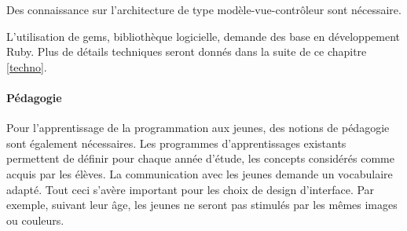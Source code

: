 Des connaissance sur l'architecture de type modèle-vue-contrôleur sont nécessaire. 

L'utilisation de gems, bibliothèque logicielle, demande des base en développement Ruby. Plus de détails techniques seront donnés dans la suite de ce chapitre \ref{techno}. %

\paragraph{Pédagogie}
Pour l'apprentissage de la programmation aux jeunes, des notions de pédagogie sont également nécessaires. 
Les programmes d'apprentissages existants permettent de définir pour chaque année d'étude, les concepts considérés comme acquis par les élèves. La communication avec les jeunes demande un vocabulaire adapté. Tout ceci s'avère important pour les choix de design d'interface. Par exemple, suivant leur âge, les jeunes ne seront pas stimulés par les mêmes images ou couleurs. %


